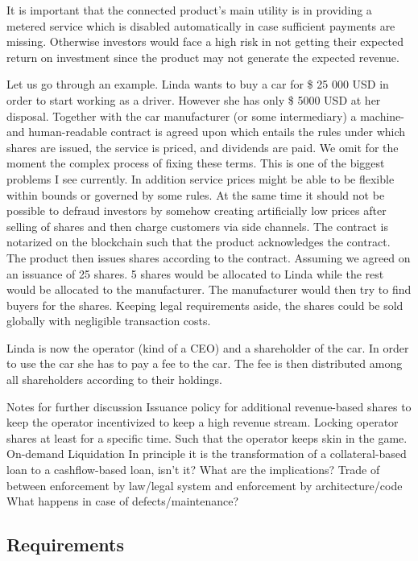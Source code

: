 It is important that the connected product's main utility is in providing a metered service which is disabled automatically in case sufficient payments are missing. Otherwise investors would face a high risk in not getting their expected return on investment since the product may not generate the expected revenue.

Let us go through an example. Linda wants to buy a car for \$ 25 000 USD in order to start working as a driver. However she has only \$ 5000 USD at her disposal. Together with the car manufacturer (or some intermediary) a machine- and human-readable contract is agreed upon which entails the rules under which shares are issued, the service is priced, and dividends are paid. 
We omit for the moment the complex process of fixing these terms. This is one of the biggest problems I see currently. In addition service prices might be able to be flexible within bounds or governed by some rules. At the same time it should not be possible to defraud investors by somehow creating artificially low prices after selling of shares and then charge customers via side channels.
The contract is notarized on the blockchain such that the product acknowledges the contract. The product then issues shares according to the contract. Assuming we agreed on an issuance of 25 shares. 5 shares would be allocated to Linda while the rest would be allocated to the manufacturer. The manufacturer would then try to find buyers for the shares. Keeping legal requirements aside, the shares could be sold globally with negligible transaction costs. 

Linda is now the operator (kind of a CEO) and a shareholder of the car. In order to use the car she has to pay a fee to the car. The fee is then distributed among all shareholders according to their holdings. 
 
Notes for further discussion
Issuance policy for additional revenue-based shares to keep the operator incentivized to keep a high revenue stream.
Locking operator shares at least  for a specific time. Such that the operator keeps skin in the game.
On-demand Liquidation
In principle it is the transformation of a collateral-based loan to a cashflow-based loan, isn't it? What are the implications?
Trade of between enforcement by law/legal system and enforcement by architecture/code
What happens in case of defects/maintenance?





\subsection{Requirements}

